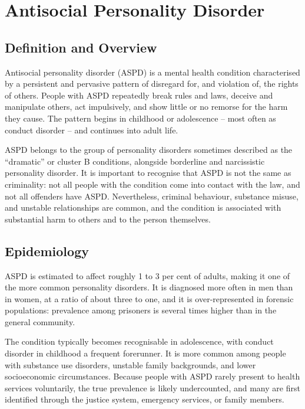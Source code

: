 \chapter{Antisocial Personality Disorder}

\section*{Definition and Overview}
Antisocial personality disorder (ASPD) is a mental health condition characterised by a persistent and pervasive pattern of disregard for, and violation of, the rights of others. People with ASPD repeatedly break rules and laws, deceive and manipulate others, act impulsively, and show little or no remorse for the harm they cause. The pattern begins in childhood or adolescence -- most often as conduct disorder -- and continues into adult life.

ASPD belongs to the group of personality disorders sometimes described as the ``dramatic'' or cluster B conditions, alongside borderline and narcissistic personality disorder. It is important to recognise that ASPD is not the same as criminality: not all people with the condition come into contact with the law, and not all offenders have ASPD. Nevertheless, criminal behaviour, substance misuse, and unstable relationships are common, and the condition is associated with substantial harm to others and to the person themselves.

\section*{Epidemiology}
ASPD is estimated to affect roughly 1 to 3 per cent of adults, making it one of the more common personality disorders. It is diagnosed more often in men than in women, at a ratio of about three to one, and it is over-represented in forensic populations: prevalence among prisoners is several times higher than in the general community.

The condition typically becomes recognisable in adolescence, with conduct disorder in childhood a frequent forerunner. It is more common among people with substance use disorders, unstable family backgrounds, and lower socioeconomic circumstances. Because people with ASPD rarely present to health services voluntarily, the true prevalence is likely undercounted, and many are first identified through the justice system, emergency services, or family members.

